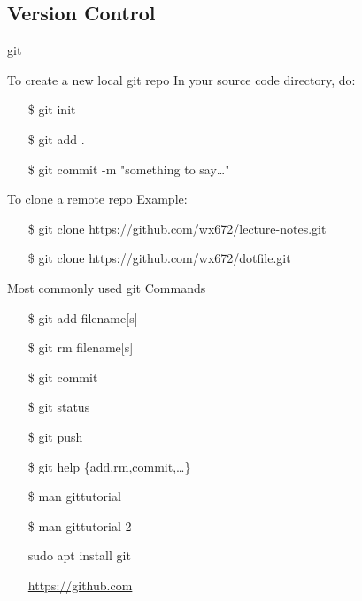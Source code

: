 \subsection{Version Control}
\label{sec:version-control}

\begin{frame}{git}
  \begin{block}{To create a new local git repo}
    In your source code directory, do:\ttfamily
    \begin{itemize}
    \item[\$] git init
    \item[\$] git add .
    \item[\$] git commit -m "something to say\ldots"
    \end{itemize}
  \end{block}
  \begin{block}{To clone a remote repo}
    Example:\ttfamily
    \begin{itemize}
    \item[\$] git clone https://github.com/wx672/lecture-notes.git
    \item[\$] git clone https://github.com/wx672/dotfile.git
    \end{itemize}
  \end{block}
\end{frame}

\begin{frame}
  \begin{block}{Most commonly used git Commands}\ttfamily
    \begin{itemize}
    \item[\$] git add filename[s]
    \item[\$] git rm filename[s]
    \item[\$] git commit
    \item[\$] git status\qquad{}\qquad{}
    \item[\$] git push\qquad{}
    \item[\$] git help \{add,rm,commit,\ldots\}
    \end{itemize}
  \end{block}
  \begin{multicols}{2}
    \begin{itemize}
    \item[\$] man gittutorial
    \item[\$] man gittutorial-2
    \item[\debian] sudo apt install git
    \item[\github] \url{https://github.com}
    \end{itemize}
  \end{multicols}
\end{frame}

